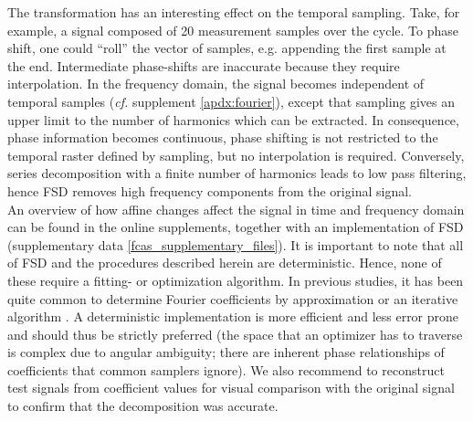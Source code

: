 The transformation has an interesting effect on the temporal sampling.
Take, for example, a signal composed of 20 measurement samples over the cycle.
To phase shift, one could ``roll'' the vector of samples, e.g. appending the first sample at the end.
Intermediate phase-shifts are inaccurate because they require interpolation.
In the frequency domain, the signal becomes independent of temporal samples (\textit{cf.} supplement \ref*{apdx:fourier}), except that sampling gives an upper limit to the number of harmonics which can be extracted.
In consequence, phase information becomes continuous, phase shifting is not restricted to the temporal raster defined by sampling, but no interpolation is required.
Conversely, series decomposition with a finite number of harmonics leads to low pass filtering, hence FSD removes high frequency components from the original signal.
\\An overview of how affine changes affect the signal in time and frequency domain can be found in the online supplements, together with an implementation of FSD (supplementary data \ref{fcas_supplementary_files}).
It is important to note that all of FSD and the procedures described herein are deterministic.
Hence, none of these require a fitting- or optimization algorithm.
In previous studies, it has been quite common to determine Fourier coefficients by approximation \citep[e.g.][]{Alexander1980} or an iterative algorithm \citep[regression, e.g.][]{Hubel2015}.
A deterministic implementation is more efficient and less error prone and should thus be strictly preferred (the space that an optimizer has to traverse is complex due to angular ambiguity; there are inherent phase relationships of coefficients that common samplers ignore).
We also recommend to reconstruct test signals from coefficient values for visual comparison with the original signal to confirm that the decomposition was accurate.



